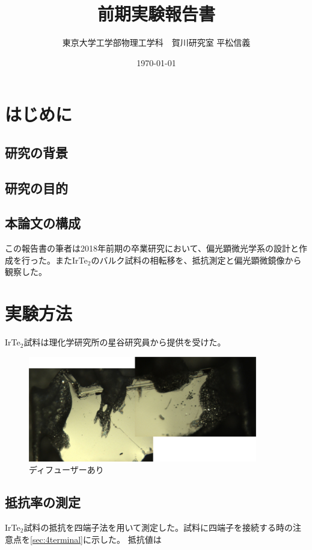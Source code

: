 \documentclass[11pt,a4paper]{jsarticle}
\title{前期実験報告書}
\author{東京大学工学部物理工学科　賀川研究室 平松信義}
\date{\today}
\begin{document}
\maketitle

\tableofcontents
\newpage

\section{はじめに}
\subsection{研究の背景}
\subsection{研究の目的}
\subsection{本論文の構成}
この報告書の筆者は2018年前期の卒業研究において、偏光顕微光学系の設計と作成を行った。またIrTe$_2$のバルク試料の相転移を、抵抗測定と偏光顕微鏡像から観察した。

\section{実験方法}
IrTe$_2$試料は理化学研究所の星谷研究員から提供を受けた。
\begin{figure}[htbp]
  \begin{center}
   \includegraphics[width=100mm]{sample.eps}
  \end{center}
  \caption{ディフューザーあり}
  \label{fig:sample}
\end{figure}

\subsection{抵抗率の測定}
IrTe$_2$試料の抵抗を四端子法を用いて測定した。試料に四端子を接続する時の注意点を\ref{sec:4terminal}に示した。
抵抗値は
\end{document}
